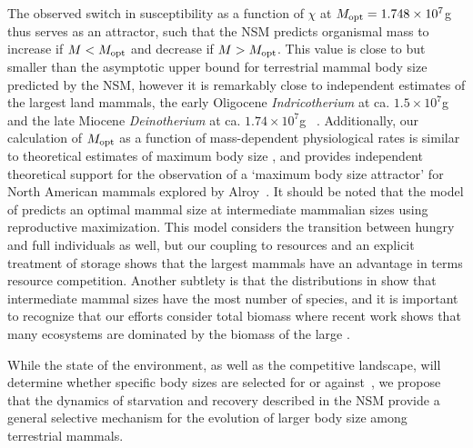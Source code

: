 \documentclass[twocolumn,preprintnumbers,amsmath,amssymb,superscriptaddress]{revtex4}
\begin{document}
The observed switch in susceptibility as a function of $\chi$ at $M_{\rm opt}= 1.748\times10^7$g thus serves as an attractor, such that the NSM predicts organismal mass to increase if $M<M_{\rm opt}$ and decrease if $M>M_{\rm opt}$.
This value is close to but smaller than the asymptotic upper bound for terrestrial mammal body size predicted by the NSM, however it is remarkably close to independent estimates of the largest land mammals, the early Oligocene \emph{Indricotherium} at ca. $1.5\times10^7$g and the late Miocene \emph{Deinotherium} at ca. $1.74\times10^7$g ~\citep{Smith:2010p3442}.
Additionally, our calculation of $M_{\rm opt}$ as a function of mass-dependent physiological rates is similar to theoretical estimates of maximum body size \citep{Clauset:2009fh}, and provides independent theoretical support for the observation of a `maximum body size attractor' for North American mammals explored by Alroy~\citep{Alroy:1998p1594}. {\color{red} It should be noted that the model of \cite{Brown:1993p708} predicts an optimal mammal size at intermediate mammalian sizes using reproductive maximization. This model considers the transition between hungry and full individuals as well, but our coupling to resources and an explicit treatment of storage shows that the largest mammals have an advantage in terms resource competition. Another subtlety is that the distributions in \cite{Brown:1993p708} show that intermediate mammal sizes have the most number of species, and it is important to recognize that our efforts consider total biomass where recent work shows that many ecosystems are dominated by the biomass of the large \cite{}.}




While the state of the environment, as well as the competitive landscape, will determine whether specific body sizes are selected for or against~\citep{Saarinen:2014br}, we propose that the dynamics of starvation and recovery described in the NSM provide a general selective mechanism for the evolution of larger body size among terrestrial mammals.\\

 \\

\end{document}
